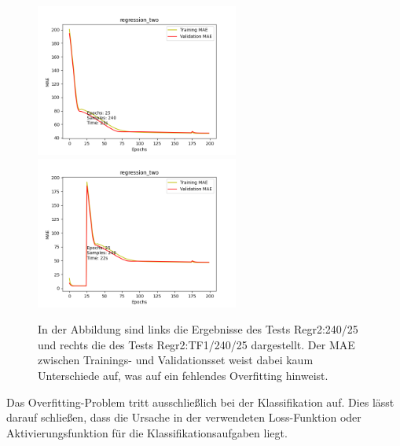 \begin{figure}[htpb]
    \includegraphics[height=5cm]{../../Plots/ba_plots/regr2/woregr2tr.png}
    \includegraphics[height=5cm]{../../Plots/ba_plots/regr2/1TFtr.png}
    \caption{\label{fig:regr2tf} 
    \small{In der Abbildung sind links die Ergebnisse des Tests Regr2:240/25 und rechts die des Tests Regr2:TF1/240/25 dargestellt. Der 
    MAE zwischen Trainings- und Validationsset weist dabei kaum Unterschiede auf, was auf ein fehlendes Overfitting 
    hinweist.}}
\end{figure}

Das Overfitting-Problem tritt ausschließlich bei der Klassifikation auf. Dies lässt darauf schließen, dass die Ursache in der verwendeten 
Loss-Funktion oder Aktivierungsfunktion für die Klassifikationsaufgaben liegt.
